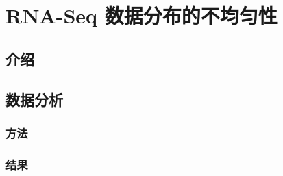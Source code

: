 \chapter{RNA-Seq 数据分布的不均匀性}
\label{chap-rna-seq-nonunif}

\section{介绍}

\section{数据分析}

\subsection{方法}

\subsection{结果}


